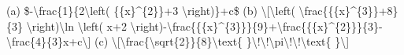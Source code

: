 \item (a) \$-\textbackslash frac\{1\}\{2\textbackslash left( \{\{x\}\textasciicircum\{2\}\}+3
\textbackslash right)\}+c\$ (b) \textbackslash{[}\textbackslash left(
\textbackslash frac\{\{\{x\}\textasciicircum\{3\}\}+8\}\{3\} \textbackslash right)\textbackslash ln
\textbackslash left( x+2 \textbackslash right)-\textbackslash frac\{\{\{x\}\textasciicircum\{3\}\}\}\{9\}+\textbackslash frac\{\{\{x\}\textasciicircum\{2\}\}\}\{3\}-\textbackslash frac\{4\}\{3\}x+c\textbackslash{]}
(c) \textbackslash{[}\textbackslash frac\{\textbackslash sqrt\{2\}\}\{8\}\textbackslash text\{
\}\textbackslash !\textbackslash !\textbackslash pi\textbackslash !\textbackslash !\textbackslash text\{
\}\textbackslash{]}
